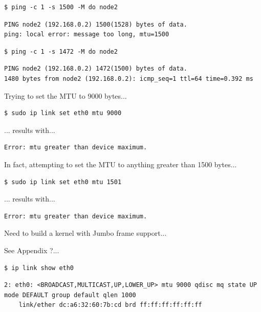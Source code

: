 \documentclass{report}
\begin{document}
\lstset{style=termstyle}
\begin{lstlisting}
$ ping -c 1 -s 1500 -M do node2
\end{lstlisting}

\lstset{style=termstyle}
\begin{lstlisting}
PING node2 (192.168.0.2) 1500(1528) bytes of data.
ping: local error: message too long, mtu=1500
\end{lstlisting}


\lstset{style=termstyle}
\begin{lstlisting}
$ ping -c 1 -s 1472 -M do node2
\end{lstlisting}


\lstset{style=termstyle}
\begin{lstlisting}
PING node2 (192.168.0.2) 1472(1500) bytes of data.
1480 bytes from node2 (192.168.0.2): icmp_seq=1 ttl=64 time=0.392 ms
\end{lstlisting}


Trying to set the MTU to 9000 bytes...

\lstset{style=termstyle}
\begin{lstlisting}
$ sudo ip link set eth0 mtu 9000 
\end{lstlisting}

... results with...

\lstset{style=termstyle}
\begin{lstlisting}
Error: mtu greater than device maximum.
\end{lstlisting}

In fact, attempting to set the MTU to anything greater than 1500 bytes...

\lstset{style=termstyle}
\begin{lstlisting}
$ sudo ip link set eth0 mtu 1501 
\end{lstlisting}

... results with...

\lstset{style=termstyle}
\begin{lstlisting}
Error: mtu greater than device maximum.
\end{lstlisting}


Need to build a kernel with Jumbo frame support...

See Appendix ?...

\lstset{style=termstyle}
\begin{lstlisting}
$ ip link show eth0
\end{lstlisting}

\lstset{style=termstyle}
\begin{lstlisting}
2: eth0: <BROADCAST,MULTICAST,UP,LOWER_UP> mtu 9000 qdisc mq state UP mode DEFAULT group default qlen 1000
    link/ether dc:a6:32:60:7b:cd brd ff:ff:ff:ff:ff:ff
\end{lstlisting}
\end{document}
